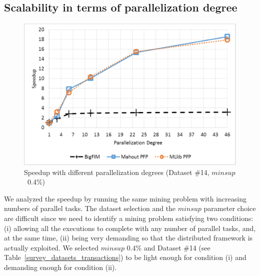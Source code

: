 \subsection{Scalability in terms of parallelization degree}
\label{nr_machines}



\begin{figure}[!t]
\begin{center}
\includegraphics[width=5in]{machines_big.eps}
\caption{Speedup with different parallelization degrees (Dataset \#14,
 $minsup$~0.4\%)}
\label{survey_nr_machines_speedup}
\end{center}
\end{figure}



We analyzed the speedup by running the same mining problem with increasing numbers of parallel tasks.
The dataset selection and the $minsup$ parameter choice are difficult 
since we need to identify a mining problem satisfying two conditions:
(i) allowing all the executions to complete with any number of parallel tasks, 
and, at the same time, 
(ii) being very demanding so that the distributed framework is actually exploited. 
We selected $minsup$ 0.4\% and Dataset \#14 (see Table~\ref{survey_datasets_transactions}) 
to be light enough for condition (i) and demanding enough for condition (ii).

